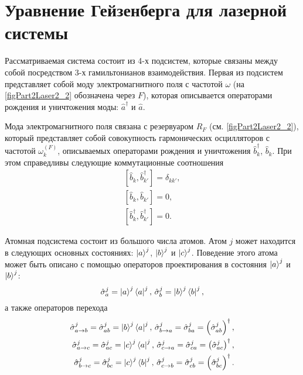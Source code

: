 \section{Уравнение Гейзенберга для лазерной системы}

Рассматриваемая система состоит из 4-х подсистем, которые связаны
между собой посредством 3-х гамильтонианов взаимодействия. Первая из
подсистем представляет собой моду электромагнитного поля с частотой
$\omega$ (на \autoref{figPart2Laser2_2} обозначена через $F$),
которая описывается операторами рождения и уничтожения моды: 
$\hat{a}^{\dag}$ и $\hat{a}$. 

Мода электромагнитного поля связана с
резервуаром $R_F$ (см. \autoref{figPart2Laser2_2}), который
представляет собой совокупность гармонических осцилляторов с частотой
$\omega_k^{(F)}$, описываемых операторами рождения и уничтожения
$\hat{b}_k^{\dag}$, $\hat{b}_k$. При этом справедливы следующие
коммутационные соотношения 
\begin{eqnarray}
\left[\hat{b}_k, \hat{b}^{\dag}_{k'}\right] = \delta_{kk'},
\nonumber \\
\left[\hat{b}_k, \hat{b}_{k'}\right] = 0,
\nonumber \\
\left[\hat{b}^{\dag}_k, \hat{b}^{\dag}_{k'}\right] = 0.
\nonumber
\end{eqnarray}

Атомная подсистема состоит из большого числа атомов. Атом $j$ может
находится в следующих основных состояниях:
$\ket{a}^j$, $\ket{b}^j$ и $\ket{c}^j$. Поведение
этого атома может быть описано с помощью операторов проектирования в
состояния $\ket{a}^j$ и $\ket{b}^j$:
\begin{equation}
\hat{\sigma}_a^j = \ket{a}^j\bra{a}^j,\,
\hat{\sigma}_b^j = \ket{b}^j\bra{b}^j,
\nonumber
\end{equation}
а также операторов перехода
\begin{eqnarray}
\hat{\sigma}_{a \rightarrow b}^j = \hat{\sigma}_{ab}^j =
\ket{b}^j\bra{a}^j,\,
\hat{\sigma}_{b \rightarrow a}^j = \hat{\sigma}_{ba}^j =
\left(\hat{\sigma}_{ab}^j\right)^{\dag},
\nonumber \\
\hat{\sigma}_{a \rightarrow c}^j = \hat{\sigma}_{ac}^j =
\ket{c}^j\bra{a}^j,\,
\hat{\sigma}_{c \rightarrow a}^j = \hat{\sigma}_{ca}^j =
\left(\hat{\sigma}_{ac}^j\right)^{\dag},
\nonumber \\
\hat{\sigma}_{b \rightarrow c}^j = \hat{\sigma}_{bc}^j =
\ket{c}^j\bra{b}^j,\,
\hat{\sigma}_{c \rightarrow b}^j = \hat{\sigma}_{cb}^j =
\left(\hat{\sigma}_{bc}^j\right)^{\dag}.
\nonumber 
\end{eqnarray}


